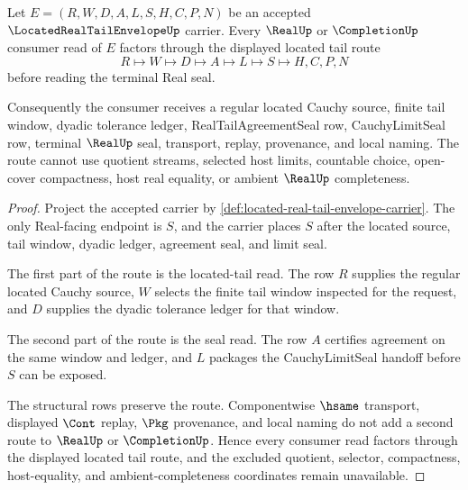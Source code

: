 \begin{theorem}
\label{thm:located-real-tail-envelope-real-seal-factorization}
Let $E=(R,W,D,A,L,S,H,C,P,N)$ be an accepted $\LocatedRealTailEnvelopeUp$ carrier. Every $\RealUp$ or $\CompletionUp$ consumer read of $E$ factors through the displayed located tail route
$$
R \longmapsto W \longmapsto D \longmapsto A \longmapsto L \longmapsto S \longmapsto H,C,P,N
$$
before reading the terminal Real seal.

Consequently the consumer receives a regular located Cauchy source, finite tail window, dyadic tolerance ledger, RealTailAgreementSeal row, CauchyLimitSeal row, terminal $\RealUp$ seal, transport, replay, provenance, and local naming. The route cannot use quotient streams, selected host limits, countable choice, open-cover compactness, host real equality, or ambient $\RealUp$ completeness.
\end{theorem}
\begin{proof}
Project the accepted carrier by \autoref{def:located-real-tail-envelope-carrier}. The only Real-facing endpoint is $S$, and the carrier places $S$ after the located source, tail window, dyadic ledger, agreement seal, and limit seal.

The first part of the route is the located-tail read. The row $R$ supplies the regular located Cauchy source, $W$ selects the finite tail window inspected for the request, and $D$ supplies the dyadic tolerance ledger for that window.

The second part of the route is the seal read. The row $A$ certifies agreement on the same window and ledger, and $L$ packages the CauchyLimitSeal handoff before $S$ can be exposed.

The structural rows preserve the route. Componentwise $\hsame$ transport, displayed $\Cont$ replay, $\Pkg$ provenance, and local naming do not add a second route to $\RealUp$ or $\CompletionUp$. Hence every consumer read factors through the displayed located tail route, and the excluded quotient, selector, compactness, host-equality, and ambient-completeness coordinates remain unavailable.
\end{proof}



